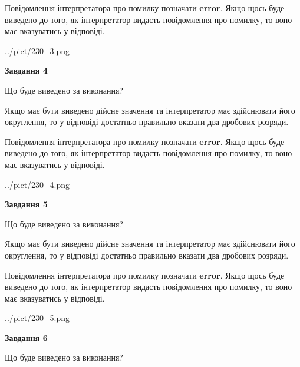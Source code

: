 \documentclass[12pt, ukrainian]{article}
\begin{document}
{\begin {Large}
Повідомлення інтерпретатора про помилку позначати \textbf{error}.
Якщо щось буде виведено до того, як інтерпретатор видасть повідомлення про помилку, 
то воно має вказуватись у відповіді. \par

\begin{center}
	{../pict/230_3.png}
\end{center}
\newpage

{\begin {center}\textbf{Завдання 4}\end {center}}\par
Що буде виведено за виконання? \par

Якщо має бути виведено дійсне значення та інтерпретатор має здійснювати його округлення, 
то у відповіді достатньо правильно вказати два дробових розряди.

Повідомлення інтерпретатора про помилку позначати \textbf{error}.
Якщо щось буде виведено до того, як інтерпретатор видасть повідомлення про помилку, 
то воно має вказуватись у відповіді. \par

\begin{center}
	{../pict/230_4.png}
\end{center}
\newpage

{\begin {center}\textbf{Завдання 5}\end {center}}\par
Що буде виведено за виконання? \par

Якщо має бути виведено дійсне значення та інтерпретатор має здійснювати його округлення, 
то у відповіді достатньо правильно вказати два дробових розряди.

Повідомлення інтерпретатора про помилку позначати \textbf{error}.
Якщо щось буде виведено до того, як інтерпретатор видасть повідомлення про помилку, 
то воно має вказуватись у відповіді. \par

\begin{center}
	{../pict/230_5.png}
\end{center}
\newpage

{\begin {center}\textbf{Завдання 6}\end {center}}\par
Що буде виведено за виконання? \par


\end{Large}}
\end{document}
